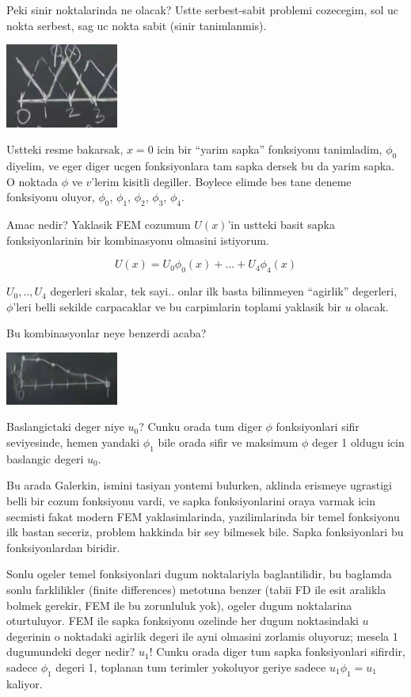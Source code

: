 \documentclass[12pt,fleqn]{article}\usepackage{../../common}
\begin{document}
Peki sinir noktalarinda ne olacak? Ustte serbest-sabit problemi cozecegim,
sol uc nokta serbest, sag uc nokta sabit (sinir tanimlanmis). 

\includegraphics[width=10em]{compscieng_1_18_02.png}

Ustteki resme bakarsak, $x=0$ icin bir ``yarim sapka'' fonksiyonu tanimladim,
$\phi_0$ diyelim, ve eger diger ucgen fonksiyonlara tam sapka dersek bu da yarim
sapka. O noktada $\phi$ ve $v$'lerim kisitli degiller. Boylece elimde bes tane
deneme fonksiyonu oluyor, $\phi_0$, $\phi_1$, $\phi_2$, $\phi_3$, $\phi_4$.

Amac nedir? Yaklasik FEM cozumum $U(x)$'in ustteki basit sapka fonksiyonlarinin
bir kombinasyonu olmasini istiyorum.

$$
U(x) = U_0 \phi_0(x) + ... + U_4 \phi_4(x)
$$

$U_0,..,U_4$ degerleri skalar, tek sayi.. onlar ilk basta bilinmeyen ``agirlik''
degerleri, $\phi$'leri belli sekilde carpacaklar ve bu carpimlarin toplami
yaklasik bir $u$ olacak.

Bu kombinasyonlar neye benzerdi acaba? 

\includegraphics[width=10em]{compscieng_1_18_03.png}

Baslangictaki deger niye $u_0$? Cunku orada tum diger $\phi$ fonksiyonlari sifir
seviyesinde, hemen yandaki $\phi_1$ bile orada sifir ve maksimum $\phi$ deger 1
oldugu icin baslangic degeri $u_0$.

Bu arada Galerkin, ismini tasiyan yontemi bulurken, aklinda erismeye ugrastigi
belli bir cozum fonksiyonu vardi, ve sapka fonksiyonlarini oraya varmak icin
secmisti fakat modern FEM yaklasimlarinda, yazilimlarinda bir temel fonksiyonu
ilk bastan seceriz, problem hakkinda bir sey bilmesek bile. Sapka fonksiyonlari
bu fonksiyonlardan biridir.

Sonlu ogeler temel fonksiyonlari dugum noktalariyla baglantilidir, bu baglamda
sonlu farklilikler (finite differences) metotuna benzer (tabii FD ile esit
aralikla bolmek gerekir, FEM ile bu zorunluluk yok), ogeler dugum noktalarina
oturtuluyor. FEM ile sapka fonksiyonu ozelinde her dugum noktasindaki $u$
degerinin o noktadaki agirlik degeri ile ayni olmasini zorlamis oluyoruz; mesela
1 dugumundeki deger nedir? $u_1$! Cunku orada diger tum sapka fonksiyonlari
sifirdir, sadece $\phi_1$ degeri 1, toplanan tum terimler yokoluyor geriye
sadece $u_1 \phi_1 = u_1$ kaliyor.
\end{document}
